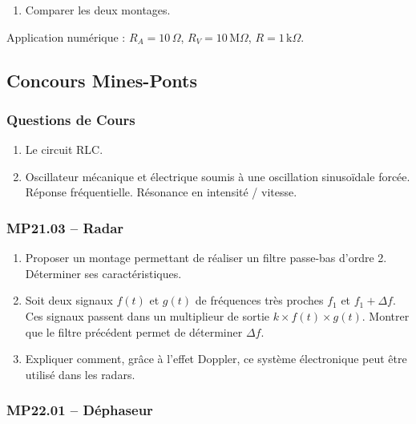 \begin{center}
\end{center}

\begin{enumerate}
    \item Comparer les deux montages.
\end{enumerate}

Application numérique : $R_A = 10\, \Omega$, $R_V = 10\, \text{M}\Omega$, $R = 1\, \text{k}\Omega$.

\newpage
\subsection*{Concours Mines-Ponts}
\subsubsection*{Questions de Cours}


\begin{enumerate}
    \item Le circuit RLC.
    \item Oscillateur mécanique et électrique soumis à une oscillation sinusoïdale forcée. Réponse fréquentielle. Résonance en intensité / vitesse.
\end{enumerate}

\subsubsection*{MP21.03 -- Radar }

\begin{enumerate}
    \item Proposer un montage permettant de réaliser un filtre passe-bas d'ordre 2. Déterminer ses caractéristiques.
    \item Soit deux signaux $f(t)$ et $g(t)$ de fréquences très proches $f_1$ et $f_1 + \Delta f$. Ces signaux passent dans un multiplieur de sortie $k \times f(t) \times g(t)$. Montrer que le filtre précédent permet de déterminer $\Delta f$.
    \item Expliquer comment, grâce à l'effet Doppler, ce système électronique peut être utilisé dans les radars.
\end{enumerate}

\subsubsection*{MP22.01 -- Déphaseur  \lesdeux}





